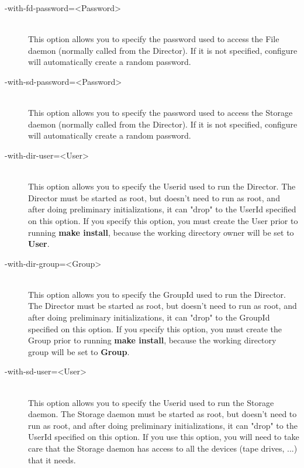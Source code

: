 \begin{description}
\item [ {-}{\-}with-fd-password={\textless}Password{\textgreater}] \hfill \\
This option allows you to specify the password used to  access the File daemon
(normally called from the Director).  If it is not specified, configure will
automatically create a random  password.

\item [ {-}{\-}with-sd-password={\textless}Password{\textgreater}] \hfill \\
This option allows you to specify the password used to access the Storage daemon
(normally called from the Director).  If it is not specified, configure will
automatically create a random  password.

\item [ {-}{\-}with-dir-user={\textless}User{\textgreater}] \hfill \\
This option allows you to specify the Userid used to run the Director.  The
Director must be started as root, but doesn't need to run as root, and
after doing preliminary initializations, it can "drop" to the UserId
specified on this option.
If you specify this option, you must
create the User prior to running {\bf make install}, because the
working directory owner will be set to {\bf User}.

\item [ {-}{\-}with-dir-group={\textless}Group{\textgreater}] \hfill \\
This option allows you to specify the GroupId used to  run the Director. The
Director must be started as root, but  doesn't need to run as root, and  after
doing preliminary initializations, it can "drop"  to the GroupId specified
on this option.
If you specify this option, you must
create the Group prior to running {\bf make install}, because the
working directory group will be set to {\bf Group}.

\item [ {-}{\-}with-sd-user={\textless}User{\textgreater}] \hfill \\
This option allows you to specify the Userid used to  run the Storage daemon.
The Storage daemon must be started as root, but  doesn't need to run as root,
and  after doing preliminary initializations, it can "drop"  to the UserId
specified on this option. If you use this option,  you will need to take care
that the Storage daemon has access  to all the devices (tape drives, ...) that
it needs.


\end{description}
